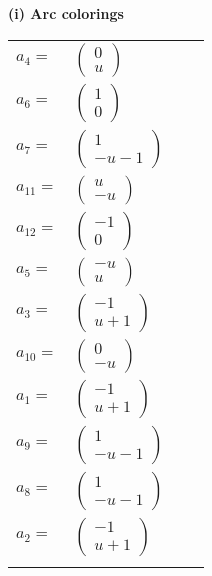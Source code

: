 \documentclass[1p]{elsarticle_modified}
\theoremstyle{definition}
\begin{document}
\flushleft \textbf{(i) Arc colorings}\\
\begin{tabular}{m{7pt} m{180pt} m{7pt} m{180pt} }
\flushright $a_{4}=$&$\begin{pmatrix}0\\u\end{pmatrix}$ \\
\flushright $a_{6}=$&$\begin{pmatrix}1\\0\end{pmatrix}$ \\
\flushright $a_{7}=$&$\begin{pmatrix}1\\- u-1\end{pmatrix}$ \\
\flushright $a_{11}=$&$\begin{pmatrix}u\\- u\end{pmatrix}$ \\
\flushright $a_{12}=$&$\begin{pmatrix}-1\\0\end{pmatrix}$ \\
\flushright $a_{5}=$&$\begin{pmatrix}- u\\u\end{pmatrix}$ \\
\flushright $a_{3}=$&$\begin{pmatrix}-1\\u+1\end{pmatrix}$ \\
\flushright $a_{10}=$&$\begin{pmatrix}0\\- u\end{pmatrix}$ \\
\flushright $a_{1}=$&$\begin{pmatrix}-1\\u+1\end{pmatrix}$ \\
\flushright $a_{9}=$&$\begin{pmatrix}1\\- u-1\end{pmatrix}$ \\
\flushright $a_{8}=$&$\begin{pmatrix}1\\- u-1\end{pmatrix}$ \\
\flushright $a_{2}=$&$\begin{pmatrix}-1\\u+1\end{pmatrix}$\\&\end{tabular}
\end{document}
